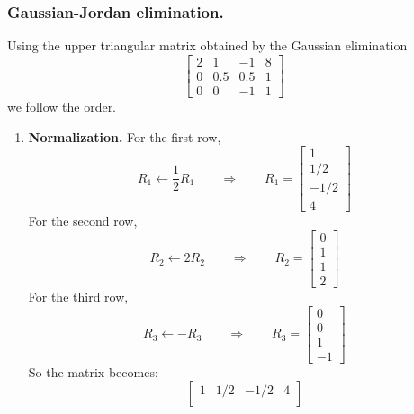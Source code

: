 \documentclass[../../../main.tex]{subfiles}
\begin{document}
\subsubsection{Gaussian-Jordan elimination.}
Using the upper triangular matrix obtained by the Gaussian elimination
\begin{equation*}
    \begin{bmatrix}
        2 & 1   & -1  & 8 \\
        0 & 0.5 & 0.5 & 1 \\
        0 & 0   & -1  & 1
    \end{bmatrix}
\end{equation*}
we follow the order.
\begin{enumerate}
    \item \textbf{Normalization.}
          For the first row,
          \begin{equation*}
              R_1 \leftarrow \frac{1 }{2 }R_1\qquad\Rightarrow\qquad R_1=
              \begin{bmatrix}
                  1 \\1/2\\-1/2\\4
              \end{bmatrix}
          \end{equation*}
          For the second row,
          \begin{equation*}
              R_2 \leftarrow 2R_2 \qquad\Rightarrow\qquad R_2=
              \begin{bmatrix}
                  0 \\1\\1\\2
              \end{bmatrix}
          \end{equation*}
          For the third row,
          \begin{equation*}
              R_3 \leftarrow -R_3 \qquad\Rightarrow\qquad R_3=
              \begin{bmatrix}
                  0 \\0\\1\\-1
              \end{bmatrix}
          \end{equation*}
          So the matrix becomes:
          \begin{equation*}
              \begin{bmatrix}
                  1 & 1/2 & -1/2 & 4 \\

\end{bmatrix}
\end{equation*}
\end{enumerate}
\end{document}
